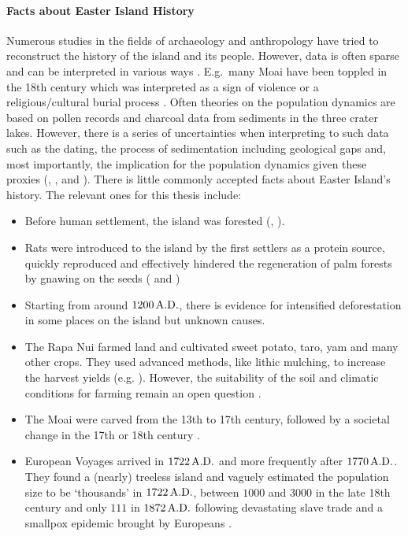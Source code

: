 \paragraph{Facts about Easter Island History}
Numerous studies in the fields of archaeology and anthropology have tried to reconstruct the history of the island and its people.
However, data is often sparse and can be interpreted in various ways \citep{Merico2017}.
E.g.\ many Moai have been toppled in the 18th century which was interpreted as a sign of violence \citep{Bahn2017} or a religious/cultural burial process \citet{Cauwe2011}.
Often theories on the population dynamics are based on pollen records and charcoal data from sediments in the three crater lakes.
However, there is a series of uncertainties when interpreting to such data such as the dating, the process of sedimentation including geological gaps and, most importantly, the implication for the population dynamics given these proxies (\citet{Bahn2017}, \citet{Hunt2007}, and \citep{Cole2008}).
There is little commonly accepted facts about Easter Island's history.
The relevant ones for this thesis include:
\begin{itemize}
	\item Before human settlement, the island was forested (\citet{Mieth2015}, \citet{Rull2010}).
	\item Rats were introduced to the island by the first settlers as a protein source, quickly reproduced and effectively hindered the regeneration of palm forests by gnawing on the seeds (\citet{Hunt2007} and \citet{Bahn2017})
	\item Starting from around $1200\,{\rm A.D.}$, there is evidence for intensified deforestation in some places on the island \citep{Rull2020} but unknown causes.
	\item The Rapa Nui farmed land and cultivated sweet potato, taro, yam and many other crops. They used advanced methods, like lithic mulching, to increase the harvest yields (e.g. \citep{Louwagie2006}). However, the suitability of the soil and climatic conditions for farming remain an open question \citep{Bahn2017}.
	\item The Moai were carved from the 13th to 17th century, followed by a societal change in the 17th or 18th century \citep{Cauwe2011}.
	\item European Voyages arrived in $1722\, {\rm A.D.}$ and more frequently after $1770\, {\rm A.D.}$. They found a (nearly) treeless island and vaguely estimated the population size to be `thousands' in $1722\, {\rm A.D.}$, between $1000$ and $3000$ in the late 18th century and only $111$ in $1872\, {\rm A.D.}$ following devastating slave trade and a smallpox epidemic brought by Europeans \citep{Bahn2017}.
\end{itemize}

